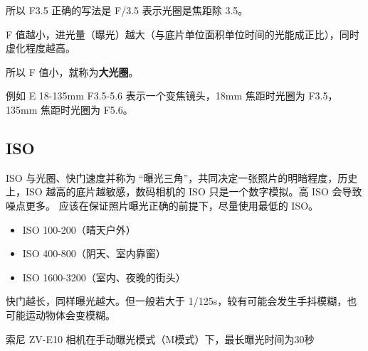 所以 F3.5 正确的写法是 F/3.5 表示光圈是焦距除 3.5。

F 值越小，进光量（曝光）越大（与底片单位面积单位时间的光能成正比），同时虚化程度越高。

所以 F 值小，就称为\textbf{大光圈}。

例如 E 18-135mm F3.5-5.6 表示一个变焦镜头，18mm 焦距时光圈为 F3.5， 135mm 焦距时光圈为 F5.6。

\subsection{ISO}
ISO 与光圈、快门速度并称为 “曝光三角”，共同决定一张照片的明暗程度，历史上，ISO 越高的底片越敏感，数码相机的 ISO 只是一个数字模拟。高 ISO 会导致噪点更多。 应该在保证照片曝光正确的前提下，尽量使用最低的 ISO。
\begin{itemize}
\item ISO 100-200（晴天户外）
\item ISO 400-800（阴天、室内靠窗）
\item ISO 1600-3200（室内、夜晚的街头）
\end{itemize}
快门越长，同样曝光越大。但一般若大于 1/125s，较有可能会发生手抖模糊，也可能运动物体会变模糊。


索尼 ZV-E10 相机在手动曝光模式（M模式）下，最长曝光时间为30秒